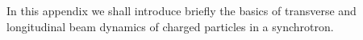 In this appendix we shall introduce briefly the basics of transverse and longitudinal beam dynamics of charged particles in a synchrotron.